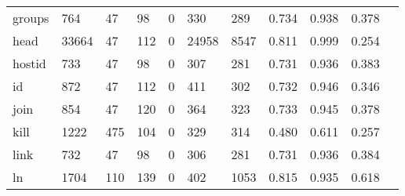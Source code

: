 \begin{longtable}{lp{1.10cm}p{1.10cm}p{1.10cm}p{1.10cm}p{1.10cm}p{1.10cm}p{1.10cm}p{1.10cm}p{1.10cm}p{1.10cm}}
groups    &                    764 &                                 47 &                                98 &                                0 &                               330 &                             289 &                          0.734 &                                 0.938 &                               0.378 \\
head      &                  33664 &                                 47 &                               112 &                                0 &                             24958 &                            8547 &                          0.811 &                                 0.999 &                               0.254 \\
hostid    &                    733 &                                 47 &                                98 &                                0 &                               307 &                             281 &                          0.731 &                                 0.936 &                               0.383 \\
id        &                    872 &                                 47 &                               112 &                                0 &                               411 &                             302 &                          0.732 &                                 0.946 &                               0.346 \\
join      &                    854 &                                 47 &                               120 &                                0 &                               364 &                             323 &                          0.733 &                                 0.945 &                               0.378 \\
kill      &                   1222 &                                475 &                               104 &                                0 &                               329 &                             314 &                          0.480 &                                 0.611 &                               0.257 \\
link      &                    732 &                                 47 &                                98 &                                0 &                               306 &                             281 &                          0.731 &                                 0.936 &                               0.384 \\
ln        &                   1704 &                                110 &                               139 &                                0 &                               402 &                            1053 &                          0.815 &                                 0.935 &                               0.618 \\

\end{longtable}
